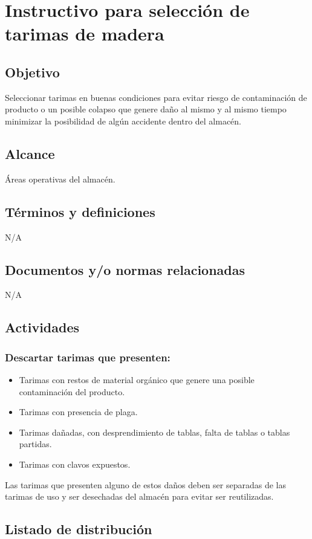 \thispagestyle{formato-PI}
\renewcommand{\MayorVer}{2}
\renewcommand{\MenorVer}{1}
\renewcommand{\Codigo}{PSA-1-PROG} %
\renewcommand{\FechaPub}{2023--01}
\renewcommand{\Titulo}{Instructivo para selección de tarimas de madera}

\section{\Titulo}

\subsection{Objetivo}

Seleccionar tarimas en buenas condiciones para evitar riesgo de contaminación de producto o un posible colapso que genere daño al mismo y al mismo tiempo minimizar la posibilidad de algún accidente dentro del almacén.

\subsection{Alcance}

Áreas operativas del almacén.

\subsection{Términos y definiciones}

N/A

\subsection{Documentos y/o normas relacionadas}

N/A

\subsection{Actividades}

\subsubsection{Descartar tarimas que presenten:}

\begin{itemize}
	\item Tarimas con restos de material orgánico que genere una posible contaminación del producto.
	\item Tarimas con presencia de plaga.
	\item Tarimas dañadas, con desprendimiento de tablas, falta de tablas o tablas partidas.
	\item Tarimas con clavos expuestos.
\end{itemize}

Las tarimas que presenten alguno de estos daños deben ser separadas de las tarimas de uso y ser desechadas del almacén para evitar ser reutilizadas.

\subsection{Listado de distribución}

